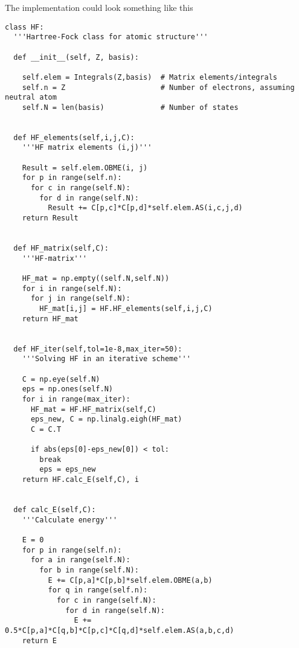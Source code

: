 The implementation could look something like this
\lstset{basicstyle=\scriptsize}
\begin{lstlisting}
class HF:
  '''Hartree-Fock class for atomic structure'''

  def __init__(self, Z, basis):

    self.elem = Integrals(Z,basis)  # Matrix elements/integrals
    self.n = Z                      # Number of electrons, assuming neutral atom
    self.N = len(basis)             # Number of states


  def HF_elements(self,i,j,C):
    '''HF matrix elements (i,j)'''

    Result = self.elem.OBME(i, j)
    for p in range(self.n):
      for c in range(self.N):
        for d in range(self.N):
          Result += C[p,c]*C[p,d]*self.elem.AS(i,c,j,d)
    return Result


  def HF_matrix(self,C):
    '''HF-matrix'''

    HF_mat = np.empty((self.N,self.N))
    for i in range(self.N):
      for j in range(self.N):
        HF_mat[i,j] = HF.HF_elements(self,i,j,C)
    return HF_mat


  def HF_iter(self,tol=1e-8,max_iter=50):
    '''Solving HF in an iterative scheme'''

    C = np.eye(self.N)
    eps = np.ones(self.N)
    for i in range(max_iter):
      HF_mat = HF.HF_matrix(self,C)
      eps_new, C = np.linalg.eigh(HF_mat)
      C = C.T

      if abs(eps[0]-eps_new[0]) < tol:
        break
        eps = eps_new
    return HF.calc_E(self,C), i


  def calc_E(self,C):
    '''Calculate energy'''

    E = 0
    for p in range(self.n):
      for a in range(self.N):
        for b in range(self.N):
          E += C[p,a]*C[p,b]*self.elem.OBME(a,b)
          for q in range(self.n):
            for c in range(self.N):
              for d in range(self.N):
                E += 0.5*C[p,a]*C[q,b]*C[p,c]*C[q,d]*self.elem.AS(a,b,c,d)
    return E
\end{lstlisting}
